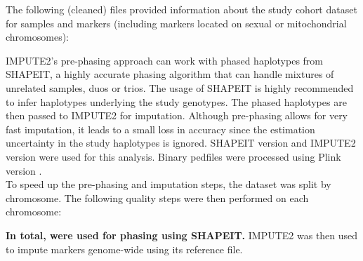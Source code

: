 
The following (cleaned) files provided information about the study cohort
dataset for  samples and 
markers (including  markers located on sexual or
mitochondrial chromosomes):


IMPUTE2's pre-phasing approach can work with phased haplotypes from SHAPEIT, a
highly accurate phasing algorithm that can handle mixtures of unrelated
samples, duos or trios. The usage of SHAPEIT is highly recommended to infer
haplotypes underlying the study genotypes. The phased haplotypes are then
passed to IMPUTE2 for imputation. Although pre-phasing allows for very fast
imputation, it leads to a small loss in accuracy since the estimation
uncertainty in the study haplotypes is ignored. SHAPEIT version
 and IMPUTE2 version  were used
for this analysis. Binary pedfiles were processed using Plink version
.\\

To speed up the pre-phasing and imputation steps, the dataset was split by
chromosome. The following quality steps were then performed on each chromosome:


\textbf{In total,  were used for phasing using
SHAPEIT.} IMPUTE2 was then used to impute markers genome-wide using its
reference file.

